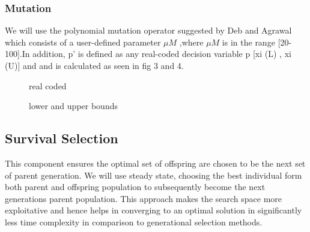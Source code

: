 \documentclass[conference]{IEEEtran}
\begin{document}
    \subsubsection{Mutation}
    We will use the polynomial mutation operator suggested by Deb and Agrawal\cite{deb1999niched} which consists of a user-defined parameter {$\mu M$} ,where {$\mu M$} is in the range [20-100].In addition, p’ is defined as any real-coded decision variable p  [xi (L) , xi (U)] and and is calculated as seen in fig 3 and 4.
        \begin{figure}[!h]
        \centering{}
        \caption{real coded}
        \label{fig:cnnj}
        \end{figure}
        \FloatBarrier
        \begin{figure}[!h]
        \centering{}
        \caption{lower and upper bounds}
        \label{fig:cnnj}
        \end{figure}
        \FloatBarrier
\subsection{Survival Selection}
This component ensures the optimal set of offspring are chosen to be the next set of parent generation. We will use steady state, choosing the best individual form both parent and offspring population to subsequently become the next generations parent population. This approach makes the search space more exploitative and hence helps in converging to an optimal solution in significantly less time complexity in comparison to generational selection methods.
\end{document}
